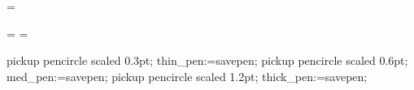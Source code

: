 
\newcount\footnoteno {}

\def\footnote#1{\edef\@sf{\spacefactor\the\spacefactor}%
 \global\advance\d@stno1\pdfgoto{#1}{\number\d@stno}\@sf
 \insert\footins\bgroup \interlinepenalty100 \eightpt
 \let\par=\endgraf \leftskip=0pt \rightskip=0pt
 \splittopskip=10pt plus 1pt minus 1pt \floatingpenalty=20000
 \smallskip\pdfcode\pdfdest num \number\d@stno fitbh\pdfendcode
 \item{#1}\bgroup\strut\aftergroup\@foot\let\next}
\skip\footins=\bigskipamount
\dimen{}\vsize
\def\footnoterule{\kern-3pt \hrule width 3cm \kern 2.6pt\nobreak}


\newdimen\fullhsize \fullhsize=\hsize
\newdimen\fullvsize \fullvsize=\vsize
\def\fullline{\hbox to\fullhsize}

\newdimen\gutter \gutter=5mm %
\newbox\partialpage
\def\begindoublecolumns{\begingroup
 \output={\global\setbox\partialpage=\vbox{\unvbox255\bigskip}}\eject
 \output={\doublecolumnout}%
 \hsize=\fullhsize \advance\hsize by-\gutter \divide\hsize by2
 \vsize=\fullvsize \multiply\vsize by2 \advance\vsize by1pc}
\def\enddoublecolumns{\output={\balancecolumns}\eject
 \endgroup \pagegoal=\vsize}

\def\doublecolumnout{\splittopskip=\topskip \splitmaxdepth=\maxdepth
 \dimen0=\fullvsize \advance\dimen0 by-\ht\partialpage
 \setbox0=\vsplit255 to\dimen0 \setbox2=\vsplit255 to\dimen0
 \shipout\vbox{\vbox to0pt{\vskip-22.5pt
  \fullline{\vbox to8.5pt{}\the\headline}\vss}\nointerlineskip
  \vbox to\fullvsize{\boxmaxdepth=\maxdepth \pagesofar}
  \baselineskip=24pt \fullline{\the\footline}}\advancepageno
 \unvbox255 \penalty\outputpenalty}
\def\balancecolumns{\setbox0=\vbox{\unvbox255}\dimen0=\ht0
 \advance\dimen0 by\topskip \advance\dimen0 by-\baselineskip
 \divide\dimen0 by2 \splittopskip=\topskip
 {\vbadness=10000 \loop \global\setbox3=\copy0
  \global\setbox1=\vsplit3 to\dimen0
  \ifdim\ht3>\dimen0 \global\advance\dimen0 by1pt \repeat}
 \setbox0=\vbox to\dimen0{\unvbox1}%
 \setbox2=\vbox to\dimen0{\dimen2=\dp3 \unvbox3 \kern-\dimen2 \vfil}%
 \pagesofar}
\def\pagesofar{\unvbox\partialpage \fullline{\box0\hfil\box2}}


\def\MTendmark{:::}

\MTcode
pickup pencircle scaled 0.3pt; thin_pen:=savepen;
pickup pencircle scaled 0.6pt; med_pen:=savepen;
pickup pencircle scaled 1.2pt; thick_pen:=savepen;

